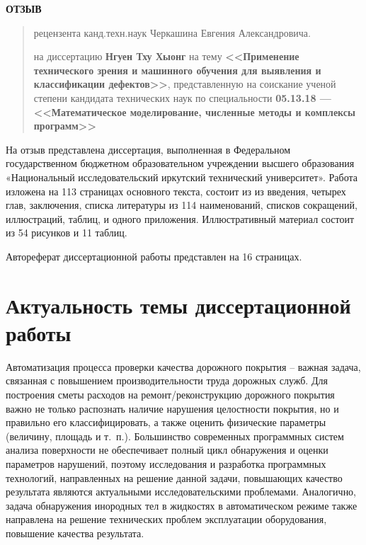 \documentclass[12pt]{extarticle}
\begin{document}
\thispagestyle{empty}

\vspace{1em}
\begin{center}
  \large\textbf{ОТЗЫВ}
\end{center}
\begin{quote}
  \noindent рецензента канд.техн.наук Черкашина Евгения Александровича.

  \noindent на диссертацию \textbf{Нгуен Тху Хыонг} на тему \textbf{<<Применение технического зрения и машинного обучения для выявления и классификации дефектов>>}, представленную на соискание ученой степени кандидата технических наук по специальности \textbf{05.13.18 — <<Математическое моделирование, численные методы и комплексы программ>>}
\end{quote}


На отзыв представлена диссертация, выполненная в Федеральном государственном бюджетном образовательном учреждении высшего образования «Национальный исследовательский иркутский технический университет».  Работа изложена на 113 страницах основного текста, состоит из из введения, четырех глав, заключения, списка литературы из 114 наименований, списков сокращений, иллюстраций, таблиц, и одного приложения.  Иллюстративный материал состоит из 54 рисунков и 11 таблиц.

Автореферат диссертационной работы представлен на 16 страницах.

\section{Актуальность темы диссертационной работы}

Автоматизация процесса проверки качества дорожного покрытия -- важная задача, связанная с повышением производительности труда дорожных служб.  Для построения сметы расходов на ремонт/реконструкцию дорожного покрытия важно не только распознать наличие нарушения целостности покрытия, но и правильно его классифицировать, а также оценить физические параметры (величину, площадь и т.~п.).  Большинство современных программных систем анализа поверхности не обеспечивает полный цикл обнаружения и оценки параметров нарушений, поэтому исследования и разработка программных технологий, направленных на решение данной задачи, повышающих качество результата являются актуальными исследовательскими проблемами.  Аналогично, задача обнаружения инородных тел в жидкостях в автоматическом режиме также направлена на решение технических проблем эксплуатации оборудования, повышение качества результата.
\end{document}
